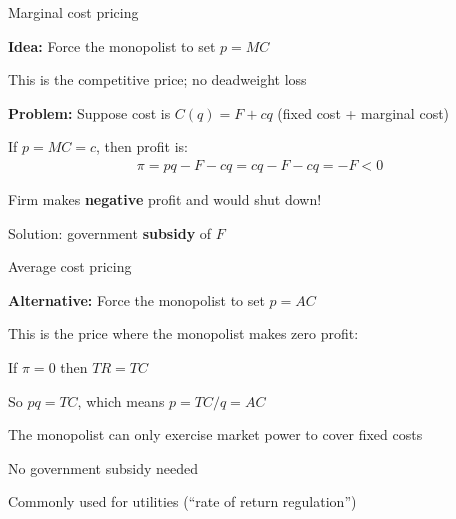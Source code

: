 \documentclass[notes,11pt, aspectratio=169]{beamer}
\newenvironment{wideitemize}{\itemize\addtolength{\itemsep}{10pt}}{\enditemize}
\begin{document}
\begin{frame}{Marginal cost pricing}
	\begin{wideitemize}
		\item \textbf{Idea:} Force the monopolist to set $p=MC$
		\begin{wideitemize}
			\vspace{5pt}
			\item This is the competitive price; no deadweight loss
		\end{wideitemize}
		\item \textbf{Problem:} Suppose cost is $C(q) = F + cq$ (fixed cost + marginal cost)
		\item If $p=MC=c$, then profit is:
		\begin{align*}
			\pi = pq - F - cq = cq - F - cq = -F < 0
		\end{align*}
		\item Firm makes \textbf{negative} profit and would shut down!
		\item Solution: government \textbf{subsidy} of $F$
	\end{wideitemize}
\end{frame}

\begin{frame}{Average cost pricing}
	\begin{wideitemize}
		\item \textbf{Alternative:} Force the monopolist to set $p=AC$
		\item This is the price where the monopolist makes zero profit:
		\begin{wideitemize}
			\vspace{5pt}
			\item If $\pi = 0$ then $TR = TC$
			\item So $pq = TC$, which means $p = TC/q = AC$
		\end{wideitemize}
		\item The monopolist can only exercise market power to cover fixed costs
		\item No government subsidy needed
		\item Commonly used for utilities (``rate of return regulation'')
	\end{wideitemize}
\end{frame}
\end{document}
